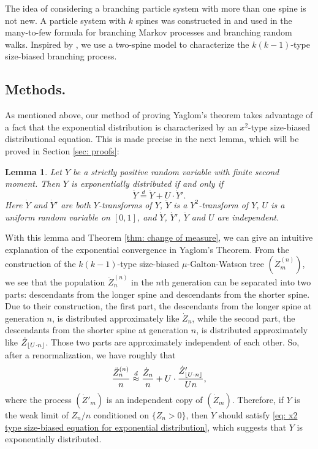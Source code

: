 \documentclass[12pt,a4paper]{amsart}
\DeclarePairedDelimiter\floor{\lfloor}{\rfloor}
\newtheorem{lem}[thm]{Lemma}
\numberwithin{equation}{section}
\begin{document}
	The idea of considering a branching particle system with more than one spine is not new.
	A particle system with $k$ spines  was constructed in \cite{harris2015many} and used in the  many-to-few formula for branching Markov processes and branching random walks.
	Inspired by \cite{harris2015many}, we use a two-spine model to characterize the $k(k-1)$-type size-biased branching process.


\subsection{Methods.}
	As mentioned above, our method of proving Yaglom's theorem takes advantage of a fact that the exponential distribution is characterized by an $x^2$-type size-biased distributional equation.
	This is made precise in the next lemma, which will be proved in Section \ref{sec: proofs}:
\begin{lem} \label{lem: our equation}
	Let $Y$ be a strictly positive random variable with finite second moment.
	Then $Y$ is exponentially distributed if and only if
\begin{equation}
\label{eq: x2 type size-biased equation for exponential distribution}
	\ddot Y \overset{d}
	= \dot Y + U \cdot \dot Y'.
\end{equation}
	Here $\dot Y$ and $\dot Y'$ are both $Y$-transforms of  $Y$, 
$\ddot Y$ is a $Y^2$-transform of $Y$, 
	$U$ is a uniform random variable on $[0,1]$, and $\dot Y$, $\dot Y'$, $\ddot Y$ 
	and $U$ are independent.
\end{lem}	
	With this lemma and Theorem \ref{thm: change of measure}, we can give an intuitive explanation of the exponential convergence in Yaglom's Theorem.
	From the construction of the $k(k-1)$-type size-biased $\mu$-Galton-Watson tree $(\ddot Z^{(n)}_m)$, we see that the population $\ddot Z^{(n)}_n$ in 
   the $n$th generation can be separated into two parts: descendants 
	from the longer spine and descendants from the shorter spine.
	Due to their construction,
	the first part, the descendants from the longer spine at generation $n$,
	is distributed approximately like $\dot Z_n$,
	while the second part, the descendants from the shorter spine at generation $n$,
		is distributed approximately like $\dot Z_{ \floor{U\cdot n}}$.
	Those two parts are approximately independent of each other.
	So, after a renormalization, we have roughly that
\begin{equation}
\label{eq: Our insight}
	\frac{\ddot Z_n^{(n)}}{n}
	\overset{d} \approx \frac{\dot Z_n}{n} + 
			U \cdot \frac{   \dot Z'_{  \floor{ U \cdot n }  }   }    {   Un   },
\end{equation}
		where the process $(\dot Z'_m)$ is an independent copy of $(\dot Z_m)$.
	Therefore, if $Y$ is the weak limit of $Z_n/n$ conditioned on $\{Z_n > 0\}$,
	then $Y$ should satisfy \eqref{eq: x2 type size-biased equation for exponential distribution}, which suggests that $Y$ is exponentially distributed.
	
\end{document}
